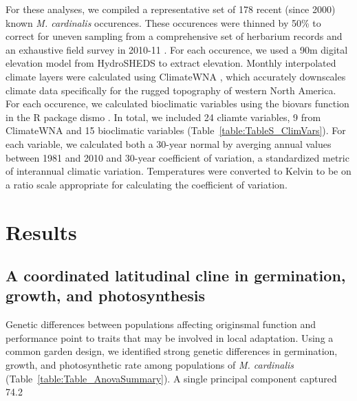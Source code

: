 \documentclass[11pt, oneside]{article}\usepackage[]{graphicx}\usepackage[]{color}
\newcommand{\pkg}[1]{{\fontseries{b}\selectfont #1}}
\begin{document}
For these analyses, we compiled a representative set of 178 recent (since 2000) known \textit{M. cardinalis} occurences. These occurences were thinned by 50\% to correct for uneven sampling from a comprehensive set of herbarium records and an exhaustive field survey in 2010-11 \citep{Angert_ENM}. For each occurence, we used a 90m digital elevation model from HydroSHEDS \citep{Lehner_etal_2006} to extract elevation. Monthly interpolated climate layers were calculated using ClimateWNA \citep{Wang_etal_2012}, which accurately downscales climate data specifically for the rugged topography of western North America. For each occurence, we calculated bioclimatic variables using the biovars function in the R package \pkg{dismo} \citep{Hijmans_etal_2014}. In total, we included 24 cliamte variables, 9 from ClimateWNA and 15 bioclimatic variables (Table~\ref{table:TableS_ClimVars}). For each variable, we calculated both a 30-year normal by averging annual values between 1981 and 2010 and 30-year coefficient of variation, a standardized metric of interannual climatic variation. Temperatures were converted to Kelvin to be on a ratio scale appropriate for calculating the coefficient of variation. 

\section*{Results}

\subsection*{A coordinated latitudinal cline in germination, growth, and photosynthesis}

Genetic differences between populations affecting originsmal function and performance point to traits that may be involved in local adaptation. Using a common garden design, we identified strong genetic differences in germination, growth, and photosynthetic rate among populations of \textit{M. cardinalis} (Table~\ref{table:Table_AnovaSummary}). A single principal component captured 74.2 %
\end{document}
